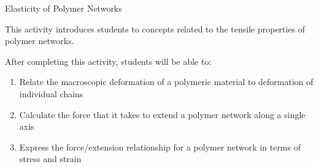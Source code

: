 %
%
%
%

\renewcommand{\figpath}{content/polymphys/mechanical-properties/elasticity/figs}
\renewcommand{\labelbase}{elasticity}

\begin{activity}{Elasticity of Polymer Networks}

\begin{instructornotes}
	This activity introduces students to concepts related to the tensile properties of polymer networks.
	
	After completing this activity, students will be able to:
	\begin{enumerate}
		\item Relate the macroscopic deformation of a polymeric material to deformation of individual chains
		\item Calculate the force that it takes to extend a polymer network along a single axis
		\item Express the force/extension relationship for a polymer network in terms of stress and strain
	\end{enumerate}
	

\end{instructornotes}
\end{activity}
